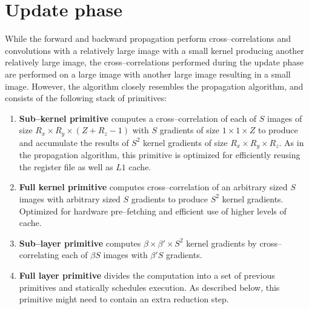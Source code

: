 \section{Update phase}

  While the forward and backward propagation perform
  cross--correlations and convolutions with a relatively large image
  with a small kernel producing another relatively large image, the
  cross--correlations performed during the update phase are performed
  on a large image with another large image resulting in a small
  image.  However, the algorithm closely resembles the propagation
  algorithm, and consists of the following stack of primitives:

  \begin{enumerate}
    \item {\bf Sub--kernel primitive} computes a cross--correlation of
      each of $S$ images of size $R_x \times R_y \times (Z + R_z - 1)$
      with $S$ gradients of size $1 \times 1 \times Z$ to produce and
      accumulate the results of $S^2$ kernel gradients of size $R_x
      \times R_y \times R_z$.  As in the propagation algorithm, this
      primitive is optimized for efficiently reusing the register file
      as well as $L1$ cache.
    \item {\bf Full kernel primitive} computes cross--correlation of
      an arbitrary sized $S$ images with arbitrary sized $S$ gradients
      to produce $S^2$ kernel gradients.  Optimized for hardware
      pre--fetching and efficient use of higher levels of cache.
    \item {\bf Sub--layer primitive} computes $\beta \times \beta'
      \times S^2$ kernel gradients by cross--correlating each of
      $\beta S$ images with $\beta' S$ gradients.
    \item {\bf Full layer primitive} divides the computation into a
      set of previous primitives and statically schedules execution.
      As described below, this primitive might need to contain an
      extra reduction step.
  \end{enumerate}


